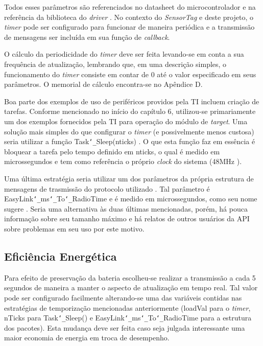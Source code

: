 Todos esses parâmetros são referenciados no datasheet do microcontrolador \cite{datasheet} e na referência da biblioteca do \emph{driver} \cite{gptimer}. No contexto do \emph{SensorTag} e deste projeto, o \emph{timer} pode ser configurado para funcionar de maneira periódica e a transmissão de mensagens ser incluída em sua função de \emph{callback}.

O cálculo da periodicidade do \emph{timer} deve ser feita levando-se em conta a sua frequência de atualização, lembrando que, em uma descrição simples, o funcionamento do \emph{timer} consiste em contar de 0 até o valor especificado em seus parâmetros. O memorial de cálculo encontra-se no Apêndice D.

Boa parte dos exemplos de uso de periféricos providos pela TI incluem criação de tarefas. Conforme mencionado no início do capítulo 6, utilizou-se primariamente um dos exemplos fornecidos pela TI para operação do módulo de \emph{target}. Uma solução mais simples do que configurar o \emph{timer} (e possivelmente menos custosa) seria utilizar a função Task\texttt{\char`_}Sleep(nticks) \cite{task-modules}. O que esta função faz em essência é bloquear a tarefa pelo tempo definido em nticks, o qual é medido em microssegundos e tem como referência o próprio \emph{clock} do sistema (48MHz \cite{datasheet}).

Uma última estratégia seria utilizar um dos parâmetros da própria estrutura de mensagens de trasmissão do protocolo utilizado \cite{forum-easylink}. Tal parâmetro é EasyLink\texttt{\char`_}ms\texttt{\char`_}To\texttt{\char`_}RadioTime e é medido em microssegundos, como seu nome sugere \cite{easylink}. Seria uma alternativa às duas últimas mencionadas, porém, há pouca informação sobre seu tamanho máximo e há relatos de outros usuários da API sobre problemas em seu uso por este motivo.

\subsection{Eficiência Energética}

Para efeito de preservação da bateria escolheu-se realizar a transmissão a cada 5 segundos de maneira a manter o aspecto de atualização em tempo real. Tal valor pode ser configurado facilmente alterando-se uma das variáveis contidas nas estratégias de temporização mencionadas anteriormente (loadVal para o \emph{timer}, nTicks para Task\texttt{\char`_}Sleep() e EasyLink\texttt{\char`_}ms\texttt{\char`_}To\texttt{\char`_}RadioTime para a estrutura dos pacotes). Esta mudança deve ser feita caso seja julgada interessante uma maior economia de energia em troca de desempenho.

